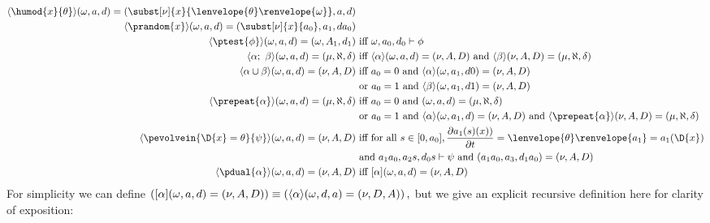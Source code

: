 \documentclass[12pt]{cmuthesis}
\theoremstyle{definition}
\theoremstyle{remark}
\newcommand{\ivr}{\psi}
\newcommand{\tint}[2]{\lenvelope{#1}\renvelope{#2}}
\begin{document}
\begin{align*}
\rzA{\sa,\aa,\da}{\humod{x}{\theta}}{\subst[\sb]{x}{\tint{\theta}{\sa}},\aa,\da}&\\
\rzA{\sa,\aa,\da}{\prandom{x}}{\subst[\sb]{x}{\rzFst{\aa}},\rzSnd{\aa},\rzApp{\da}{\rzFst{\aa}}}&\\
\rzA{\sa,\aa,\da}{\ptest{\phi}}{\sa,\rzSnd{\ab},\rzSnd{\da}}&\text{ iff }\rzF{\sa,\rzFst{\aa},\rzFst{\da}}{\phi}\\
\rzA{\sa,\aa,\da}{\alpha;~\beta}{\Sc,\ac,\dc}&\text{ iff }\rzA{\sa,\aa,\da}{\alpha}{\sb,\ab,\db}\text{ and }\rzA{\sb,\ab,\db}{\beta}{\Sc,\ac,\dc}\\
\rzA{\sa,\aa,\da}{\alpha \cup \beta}{\sb,\ab,\db}&\text{ iff }\rzFst{\aa}=0\text{ and }\rzA{\sa,\rzSnd{\aa},\da 0}{\alpha}{\sb,\ab,\db}\\
                                                 &\text{ or }\rzFst{\aa}=1\text{ and }\rzA{\sa,\rzSnd{\aa},\da 1}{\beta}{\sb,\ab,\db}\\
\rzA{\sa,\aa,\da}{\prepeat{\alpha}}{\Sc,\ac,\dc}&\text{ iff }\rzFst{\aa}=0\text{ and }(\sa,\aa,\da)=(\Sc,\ac,\dc)\\
                                                &\text{ or }\rzFst{\aa}=1\text{ and }\rzA{\sa,\rzSnd{\aa},\da}{\alpha}{\sb,\ab,\db}\text{ and }\rzA{\sb,\ab,\db}{\prepeat{\alpha}}{\Sc,\ac,\dc}\\
\rzA{\sa,\aa,\da}{\pevolvein{\D{x}=\theta}{\ivr}}{\sb,\ab,\db}&\text{ iff for all }s\in[0,\rzFst{a}], \frac{\partial \rzSnd{a}(s)(x))}{\partial t}=\tint{\theta}{\rzSnd{a}}=\rzSnd{a}(\D{x})\\
                                                 &\text{ and }\rzF{\rzApp{\rzSnd{\aa}}{\rzFst{\aa}},\rzApp{\rzThd{a}}{s},\rzApp{\rzFst{\da}}{s}}{\ivr}\text{ and } (\rzApp{\rzSnd{a}}{\rzFst{a}},\rzFrt{a},\rzApp{\rzSnd{d}}{\rzFst{a}})=(\sb,\ab,\db)\\
\rzA{\sa,\aa,\da}{\pdual{\alpha}}{\sb,\ab,\db} &\text{ iff }\rzD{\sa,\aa,\da}{\alpha}{\sb,\ab,\db}
\end{align*}
For simplicity we can define $\left([{\alpha}](\omega,a,d)=(\nu,A,D)\right) \equiv \left(\langle{\alpha}\rangle(\omega,d,a)=(\nu,D,A)\right),$ but we give an explicit recursive definition here for clarity of exposition:
\end{document}
